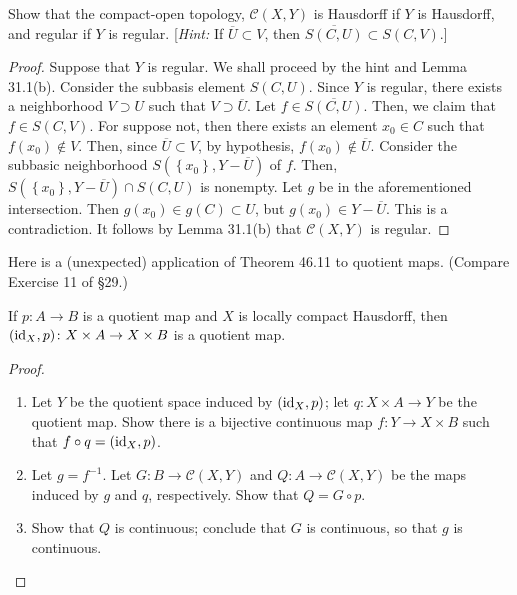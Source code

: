 \begin{problem}[Munkres \S46, Ex.\,6]
Show that the compact-open topology, $\mathcal{C}(X,Y)$ is
Hausdorff if $Y$ is Hausdorff, and regular if $Y$ is
regular. [\emph{Hint:} If $\overline U\subset V$, then
$\overline{S(C,U)}\subset S(C,V)$.]
\end{problem}
\begin{proof}
Suppose that $Y$ is regular. We shall proceed by the
hint and Lemma 31.1(b). Consider the subbasis element
$S(C,U)$. Since $Y$ is regular, there exists a neighborhood
$V\supset U$ such that $V\supset\overline{U}$. Let
$f\in\overline{S(C,U)}$. Then, we claim that $f\in S(C,V)$. For
suppose not, then there exists an element $x_0\in C$ such that
$f(x_0)\notin V$. Then, since $\overline{U}\subset V$, by
hypothesis, $f(x_0)\notin\overline{U}$. Consider the subbasic
neighborhood $S\left(\left\{x_0\right\},Y-\overline{U}\right)$ of
$f$. Then, $S\left(\left\{x_0\right\},Y-\overline{U}\right)\cap
S(C,U)$ is nonempty. Let $g$ be in the aforementioned
intersection. Then $g(x_0)\in g(C)\subset U$, but $g(x_0)\in
Y-\overline{U}$. This is a contradiction. It follows by Lemma
31.1(b) that $\mathcal{C}(X,Y)$ is regular.
\end{proof}
\newpage
\begin{problem}[Munkres \S46, Ex.\,9(a,b,c)]
Here is a (unexpected) application of Theorem 46.11 to quotient
maps. (Compare Exercise 11 of \S29.)
\begin{theorem*}
If $p\colon A\to B$ is a quotient map and $X$ is locally compact
Hausdorff, then $(\operatorname{id}_X,p)\colon X\times A\to X\times B$ is a
quotient map.
\begin{proof}
\renewcommand\qedsymbol{\null}
\begin{enumerate}[label=(\alph*)]
\item Let $Y$ be the quotient space induced by $(\operatorname{id}_X,p)$; let
  $q\colon X\times A\to Y$ be the quotient map. Show there is a
  bijective continuous map $f\colon Y\to X\times B$ such that
  $f\circ q=(\operatorname{id}_X,p)$.
\item Let $g=f^{-1}$. Let $G\colon B\to\mathcal{C}(X,Y)$ and
  $Q\colon A\to\mathcal{C}(X,Y)$ be the maps induced by $g$ and
  $q$, respectively. Show that $Q=G\circ p$.
\item Show that $Q$ is continuous; conclude that $G$ is
  continuous, so that $g$ is continuous.
\end{enumerate}
\end{proof}
\end{theorem*}
\end{problem}
